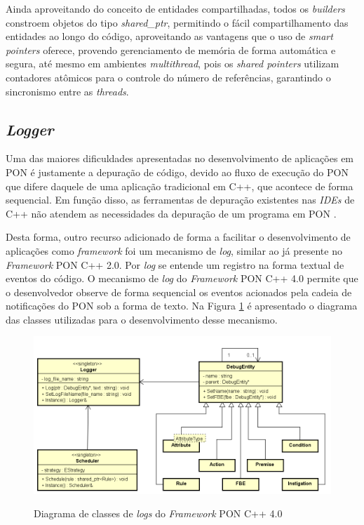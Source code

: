 Ainda aproveitando do conceito de entidades compartilhadas, todos os
\textit{builders} constroem objetos do tipo \textit{shared\_ptr}, permitindo o
fácil compartilhamento das entidades ao longo do código, aproveitando as
vantagens que o uso de \textit{smart pointers} oferece, provendo gerenciamento
de memória de forma automática e segura, até mesmo em ambientes
\textit{multithread}, pois os \textit{shared pointers} utilizam contadores
atômicos para o controle do número de referências, garantindo o sincronismo
entre as \textit{threads}.

\subsection{\textit{Logger}}

Uma das maiores dificuldades apresentadas no desenvolvimento de aplicações em
PON é justamente a depuração de código, devido ao fluxo de execução do PON que
difere daquele de uma aplicação tradicional em C++, que acontece de forma
sequencial. Em função disso, as ferramentas de depuração existentes nas
\textit{IDEs} de C++ não atendem as necessidades da depuração de um programa em
PON \cite{msc_Ronszcka_2012}.

Desta forma, outro recurso adicionado de forma a facilitar o desenvolvimento de
aplicações como  \textit{framework} foi um mecanismo de \textit{log}, similar ao
já presente no \textit{Framework} PON C++ 2.0. Por \textit{log} se entende um
registro na forma textual de eventos do código. O mecanismo de \textit{log} do
\textit{Framework} PON C++ 4.0 permite que o desenvolvedor observe de forma
sequencial os eventos acionados pela cadeia de notificações do PON sob a forma
de texto. Na Figura \ref{fig:class_fw4_log} é apresentado o diagrama das classes
utilizadas para o desenvolvimento desse mecanismo.

\begin{figure}[!htb]
    \centering
    \caption{Diagrama de classes de \textit{logs} do \textit{Framework} PON C++
    4.0}
    \includegraphics[width=\textwidth]{../figures/logger_class.png}
    \smallskip
    \label{fig:class_fw4_log}
\end{figure}

